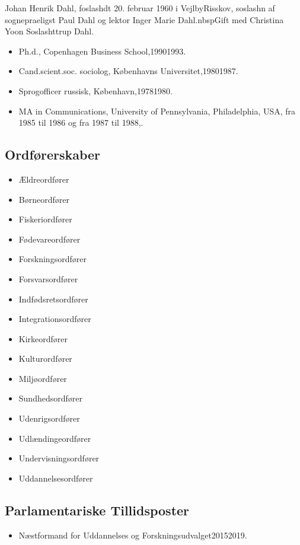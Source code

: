 \documentclass[11pt, a4paper]{awesome-cv}
\begin{document}
\makecvheader[R]
\makelettertitle
\begin{cvletter}
Johan Henrik Dahl, foslashdt 20. februar 1960 i VejlbyRisskov, soslashn af sognepraeligst Paul Dahl og lektor Inger Marie Dahl.nbspGift med Christina Yoon Soslashttrup Dahl.

\begin{itemize}
\item Ph.d., Copenhagen Business School,19901993.
\item Cand.scient.soc. sociolog, Københavns Universitet,19801987.
\item Sprogofficer russisk, København,19781980.
\item MA in Communications, University of Pennsylvania, Philadelphia, USA, fra 1985 til 1986 og fra 1987 til 1988,.
\end{itemize}
\subsection*{Ordførerskaber}
\begin{itemize}
\item Ældreordfører
\item Børneordfører
\item Fiskeriordfører
\item Fødevareordfører
\item Forskningsordfører
\item Forsvarsordfører
\item Indfødsretsordfører
\item Integrationsordfører
\item Kirkeordfører
\item Kulturordfører
\item Miljøordfører
\item Sundhedsordfører
\item Udenrigsordfører
\item Udlændingeordfører
\item Undervisningsordfører
\item Uddannelsesordfører
\end{itemize}
\subsection*{Parlamentariske Tillidsposter}
\begin{itemize}
\item Næstformand for Uddannelses og Forskningsudvalget20152019.
\end{itemize}

\end{cvletter}
\end{document}
